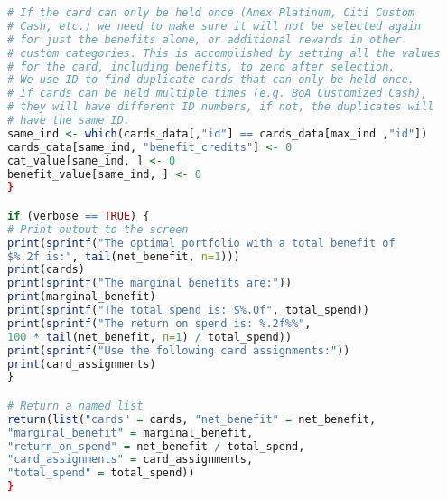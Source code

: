 \begin{lstlisting}[language=R]
# If the card can only be held once (Amex Platinum, Citi Custom 
# Cash, etc.) we need to make sure it will not be selected again 
# for just the benefits alone, or additional rewards in other 
# custom categories. This is accomplished by setting all the values 
# for the card, including benefits, to zero after selection. 
# We use ID to find duplicate cards that can only be held once.
# If cards can be held multiple times (e.g. BoA Customized Cash), 
# they will have different ID numbers, if not, the duplicates will 
# have the same ID.
same_ind <- which(cards_data[,"id"] == cards_data[max_ind ,"id"])
cards_data[same_ind, "benefit_credits"] <- 0
cat_value[same_ind, ] <- 0
benefit_value[same_ind, ] <- 0
}

if (verbose == TRUE) {
# Print output to the screen
print(sprintf("The optimal portfolio with a total benefit of 
$%.2f is:", tail(net_benefit, n=1))) 
print(cards)
print(sprintf("The marginal benefits are:"))
print(marginal_benefit)
print(sprintf("The total spend is: $%.0f", total_spend))
print(sprintf("The return on spend is: %.2f%%", 
100 * tail(net_benefit, n=1) / total_spend))
print(sprintf("Use the following card assignments:"))
print(card_assignments)
}

# Return a named list
return(list("cards" = cards, "net_benefit" = net_benefit, 
"marginal_benefit" = marginal_benefit,
"return_on_spend" = net_benefit / total_spend,
"card_assignments" = card_assignments,
"total_spend" = total_spend))
}

\end{lstlisting}
\doublespacing

